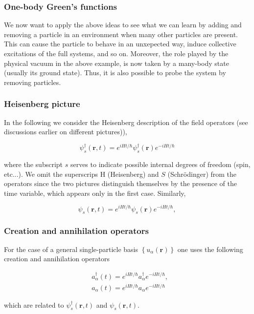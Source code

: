 \documentclass[compress]{beamer}
\begin{document}
\frame
{
\frametitle{One-body Green's functions}
\begin{small}
{\scriptsize

We now want to apply the above ideas to see what we can learn by
adding and removing a particle in an environment when many other particles are
present. This can cause the particle to behave in an unxepected way,
induce collective excitations of the full systems, and so
on. Moreover, the role played by the physical vacuum in the above
example, is now taken by a many-body state (usually its ground
state). Thus, it is also possible to probe the system by removing
particles.

}
\end{small}
}


\frame
{
\frametitle{Heisenberg picture}
\begin{small}
{\scriptsize

In the following we consider the Heisenberg description of the field operators (see discussions earlier on different pictures)),

$$
\psi_{s}^{\dagger}(\mathbf{r}, t)=e^{i H t / \hbar} \psi_{s}^{\dagger}(\mathbf{r}) e^{-i H t / \hbar}
$$

where the subscript $s$ serves to indicate possible internal degrees of freedom (spin, etc...). We omit the superscrips $\mathrm{H}$ (Heisenberg) and $S$ (Schr\"odinger) from the operators since the two pictures distinguish themselves by  the presence of the time variable, which appears only in the first case. Similarly,

$$
\psi_{s}(\mathbf{r}, t)=e^{i H t / \hbar} \psi_{s}(\mathbf{r}) e^{-i H t / \hbar},
$$

}
\end{small}
}


\frame
{
\frametitle{Creation and annihilation operators}
\begin{small}
{\scriptsize

For the case of a general single-particle basis
$\left\{u_{\alpha}(\mathbf{r})\right\}$ one uses the following
creation and annihilation operators

$$
\begin{aligned}
& a_{\alpha}^{\dagger}(t)=e^{i H t / \hbar} a_{\alpha}^{\dagger} e^{-i H t / \hbar}, \\
& a_{\alpha}(t)=e^{i H t / \hbar} a_{\alpha} e^{-i H t / \hbar}
\end{aligned}
$$

which are related to $\psi_{s}^{\dagger}(\mathbf{r}, t)$ and
$\psi_{s}(\mathbf{r}, t)$.

}
\end{small}
}
\end{document}

